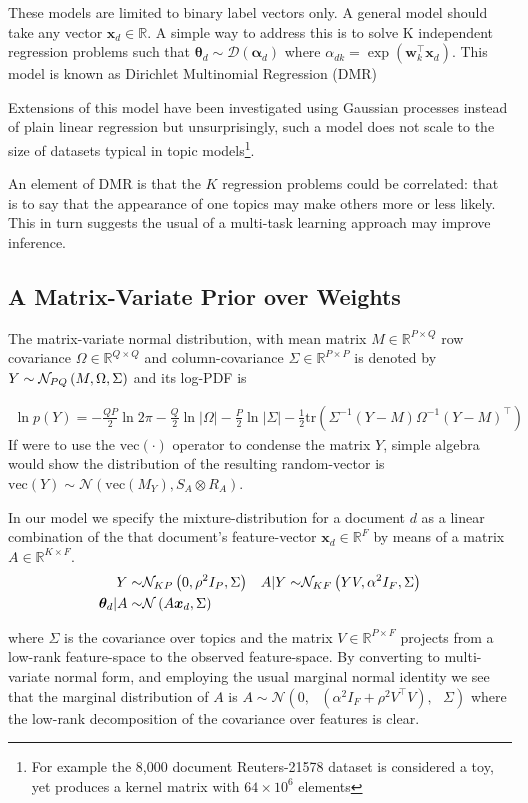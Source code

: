 \documentclass[10pt,fleqn]{article}
\newcommand \vecf[1] {
    \text{vec}\left(#1\right)
}
\newcommand \halve[1] {
	\frac{#1}{2}
}
\newcommand \half {
    \halve{1}
}
\newcommand \tr { \text{tr} }
\newcommand \T { ^\top }
\newcommand \vv[1] { \bm #1 }
\newcommand \thd[0]  { { \vv \theta_d } }
\newcommand \xd      { { \vv x_d } }
\newcommand \axd     { A\bm x_d}
\newcommand \nor[2]   { \mathcal{N} \left( {#1}, {#2} \right) }
\newcommand \mnor[3]  { \mathcal{N} \left(#1, #2, #3\right) }
\newcommand \dir[1]   { \mathcal{D} \left( {#1} \right) }
\newcommand \dir[1]   { \mathcal{D} \left( {#1} \right) }
\newcommand \Tr[1]   { \tr \left(  {#1}  \right) }
\newcommand \VReal[1] { { \mathbb{R}^{#1} } }
\newcommand \MReal[2] { { \mathbb{R}^{#1 \times #2} } }
\newcommand \inv[1] { {#1}^{-1} }
\begin{document}
These models are limited to binary label vectors only. A general model should take any vector $\xd \in \mathbb{R}$. A simple way to address this is to solve K independent regression problems such that $\thd \sim \dir{\vv{\alpha}_{d}}$ where $\alpha_{dk} = \exp(\vv{w}_k\T\vv{x}_d)$\cite{Mimno2008}. This model is known as Dirichlet Multinomial Regression (DMR)

Extensions of this model have been investigated using Gaussian processes instead of plain linear regression\cite{Hennig2012} but unsurprisingly, such a model does not scale to the size of datasets typical in topic models\footnote{For example the 8,000 document Reuters-21578 dataset is considered a toy, yet produces a kernel matrix with $64 \times 10^6$ elements}.

An element of DMR is that the $K$ regression problems could be correlated: that is to say that the appearance of one topics may make others more or less likely. This in turn suggests the usual of a multi-task learning approach may improve inference.

\subsection{A Matrix-Variate Prior over Weights}
The matrix-variate normal distribution, with mean matrix $M \in \MReal{P}{Q}$ row covariance $\Omega \in \MReal{Q}{Q}$ and column-covariance $\Sigma \in \MReal{P}{P}$ is denoted by $Y \sim \mathcal{N}_{{PQ}} \left(M, \Omega, \Sigma\right)$ and its log-PDF is

\begin{align}
\ln p(Y) = 
-\halve{QP} \ln 2\pi
-\halve{Q}\ln |\Omega|
-\halve{P}\ln |\Sigma|
-\half
\Tr{
    \inv{\Sigma}(Y - M)\inv{\Omega}(Y - M)\T
}
\end{align}
If were to use the $\vecf{\cdot}$ operator to condense the matrix $Y$, simple algebra would show the distribution of the resulting random-vector is $\vecf{Y} \sim \nor{\vecf{M_Y}}{S_A \otimes R_A}$.

In our model we specify the mixture-distribution for a document $d$ as a linear combination of the that document's feature-vector $\xd \in \VReal{F}$ by means of a matrix $A \in \MReal{K}{F}$.
\begin{align}
Y \sim & \mnord{KP}{0}{\rho^2 I_P}{\Sigma} & A|Y \sim & \mnord{KF}{YV}{\alpha^2 I_F}{\Sigma} \\
\thd | A \sim & \nor{\axd}{\Sigma}
\end{align}

where $\Sigma$ is the covariance over topics and the matrix $V \in \MReal{P}{F}$ projects from a low-rank feature-space to the observed feature-space. By converting to multi-variate normal form, and employing the usual marginal normal identity\cite{Bishop2006}  we see that the marginal distribution of $A$ is
$ A \sim \mnor{0}{\text{ }(\alpha^2 I_F + \rho^2 V\T V)}{\text{ }\Sigma}$ where the low-rank decomposition of the covariance over features is clear. 
\end{document}
